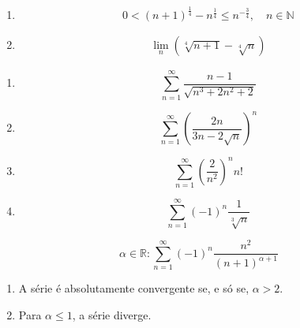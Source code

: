 \documentclass[11pt, a4paper]{article}
\begin{document}
\clearpage


\begin{enumerate}[label=\arabic{section}.\arabic*.]
	\item
	      \begin{equation}
		      0 < (n + 1)^\frac{1}{4}-n^\frac{1}{4}\leq n^{-\frac{3}{4}}, \quad
		      n \in \mathbb{N}
	      \end{equation}
	\item
	      \begin{align*}
		      \lim_{n} \left(\sqrt[4]{n + 1}-\sqrt[4]{n}\right)
	      \end{align*}
\end{enumerate}


\begin{enumerate}[label=\arabic{section}.\arabic*.]
	\item
	      \begin{equation}
		      \sum_{n=1}^{\infty} \frac{n - 1}{\sqrt{n^3 + 2n^2 + 2}}
	      \end{equation}
	\item
	      \begin{equation}
		      \sum_{n=1}^{\infty} \left(\frac{2n}{3n -2\sqrt{n}}\right)^n
	      \end{equation}
	\item
	      \begin{equation}
		      \sum_{n=1}^{\infty} \left(\frac{2}{n^2}\right)^n n!
	      \end{equation}
	\item
	      \begin{equation}
		      \sum_{n=1}^{\infty} (-1)^n \frac{1}{\sqrt[3]{n}}
	      \end{equation}
\end{enumerate}

\clearpage


\begin{equation}
	\alpha \in \mathbb{R}: \sum_{n=1}^{\infty}
	(-1)^n \frac{n^2}{(n + 1)^{\alpha + 1}}
\end{equation}

\begin{enumerate}[label=\arabic{section}.\arabic*.]
	\item
	      \begin{proposition}
		      A série é absolutamente convergente se, e só se, $\alpha > 2$.
	      \end{proposition}
	\item
	      \begin{proposition}
		      Para $\alpha \leq 1$, a série diverge.
	      \end{proposition}
\end{enumerate}
\end{document}
